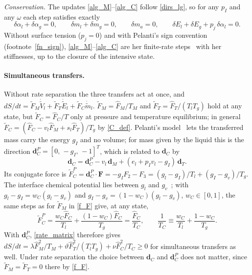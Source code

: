 \emph{Conservation.} The updates \eqref{alg_M}--\eqref{alg_C} follow \eqref{dirs_lg}, so for any $p_I$ and any $\omega$ each step satisfies exactly
\begin{equation}\label{alg_cons}
\delta\alpha_l+\delta\alpha_g=0,\qquad \delta m_l+\delta m_g=0,\qquad \delta m_a=0,\qquad \delta E_l+\delta E_g+p_{j}\,\delta\alpha_l=0 .
\end{equation}
Without surface tension ($p_{j}=0$) and with Pelanti's sign convention (footnote~\ref{fn_sign}), \eqref{alg_M}--\eqref{alg_C} are her finite-rate steps~\cite[eqs.~(54)--(56), (65)--(67), (75)--(77)]{Pelanti2022} with her stiffnesses, up to the closure of the intensive state.

\paragraph{Simultaneous transfers.}
Without rate separation the three transfers act at once, and $dS/dt=\tilde{F}_M\dot{\tilde{V}}_l+\tilde{F}_T\dot{\tilde{E}}_l+\tilde{F}_C\dot{\tilde{m}}_l$. $\tilde{F}_M=\hat{F}_M/T_M$ and $\tilde{F}_T=\hat{F}_T/(T_lT_g)$ hold at any state, but $\tilde{F}_C=\hat{F}_C/T$ only at pressure and temperature equilibrium; in general $\tilde{F}_C=(\hat{F}_C-v_l\hat{F}_M+s_l\hat{F}_T)/T_g$ by \eqref{C_def}. Pelanti's model~\cite[eqs.~(1e), (1f)]{Pelanti2022} lets the transferred mass carry the energy $g_I$ and no volume; for mass given by the liquid this is the direction $\boldsymbol{d}_C^P=[0,\,-g_I,\,-1]^T$, which is related to $\boldsymbol{d}_C$ by
\begin{equation}\label{dC_dCP}
\boldsymbol{d}_C=\boldsymbol{d}_C^P-v_l\,\boldsymbol{d}_M+(e_l+p_Iv_l-g_I)\,\boldsymbol{d}_T .
\end{equation}
Its conjugate force is $\tilde{F}_C^P=\boldsymbol{d}_C^P\cdot\boldsymbol{F}=-g_IF_2-F_3=(g_l-g_I)/T_l+(g_I-g_v)/T_g$. The interface chemical potential lies between $g_l$ and $g_v$~\cite[eq.~(3)]{Pelanti2022}; with $g_l-g_I=w_C(g_l-g_v)$ and $g_I-g_v=(1-w_C)(g_l-g_v)$, $w_C\in[0,1]$, the same steps as for $\tilde{F}_M$ in \eqref{f_F} give, at any state,
\begin{equation}\label{f_P}
\tilde{F}_C^P=\frac{w_C\hat{F}_C}{T_l}+\frac{(1-w_C)\hat{F}_C}{T_g}=\frac{\hat{F}_C}{T_C},\qquad \frac1{T_C}\equiv\frac{w_C}{T_l}+\frac{1-w_C}{T_g}.
\end{equation}
With $\boldsymbol{d}_C^P$, \eqref{rate_matrix} therefore gives $dS/dt=\lambda \hat{F}_M^2/T_M+\vartheta \hat{F}_T^2/(T_lT_g)+\nu \hat{F}_C^2/T_C\ge0$ for simultaneous transfers as well. Under rate separation the choice between $\boldsymbol{d}_C$ and $\boldsymbol{d}_C^P$ does not matter, since $\tilde{F}_M=\tilde{F}_T=0$ there by \eqref{f_F}.

